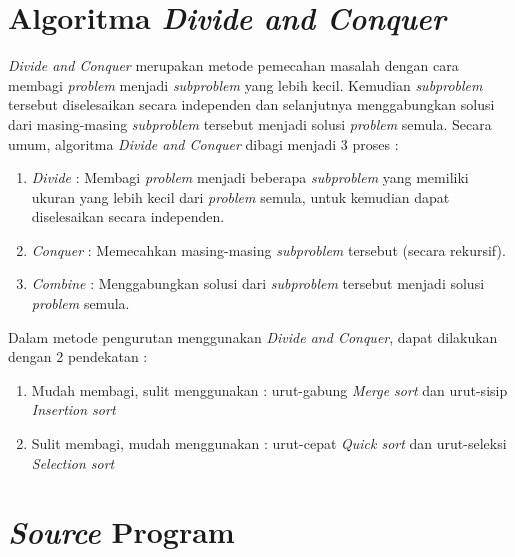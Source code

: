 \documentclass{article}
\begin{document}
	\section{Algoritma \textit{Divide and Conquer}}
	\par \textit{Divide and Conquer} merupakan metode pemecahan masalah dengan cara membagi \textit{problem} menjadi \textit{subproblem} yang lebih kecil. Kemudian \textit{subproblem} tersebut diselesaikan secara independen dan selanjutnya menggabungkan solusi dari masing-masing \textit{subproblem} tersebut menjadi solusi \textit{problem} semula. Secara umum, algoritma \textit{Divide and Conquer} dibagi menjadi 3 proses :
	\begin{enumerate}
		\item \textit{Divide} : Membagi \textit{problem} menjadi beberapa \textit{subproblem} yang memiliki ukuran yang lebih kecil dari \textit{problem} semula, untuk kemudian dapat diselesaikan secara independen.
		\item \textit{Conquer} : Memecahkan masing-masing \textit{subproblem} tersebut (secara rekursif).
		\item \textit{Combine} : Menggabungkan solusi dari \textit{subproblem} tersebut menjadi solusi \textit{problem} semula.
	\end{enumerate}
	\par Dalam metode pengurutan menggunakan \textit{Divide and Conquer}, dapat dilakukan dengan 2 pendekatan :
	\begin{enumerate}
		\item Mudah membagi, sulit menggunakan : urut-gabung \textit{Merge sort} dan urut-sisip \textit{Insertion sort}
		\item Sulit membagi, mudah menggunakan : urut-cepat \textit{Quick sort} dan urut-seleksi \textit{Selection sort}
	\end{enumerate}
	
	\clearpage
	\section{\textit{Source} Program}

	
	
	
	
	
	
	
	
	
\end{document}
